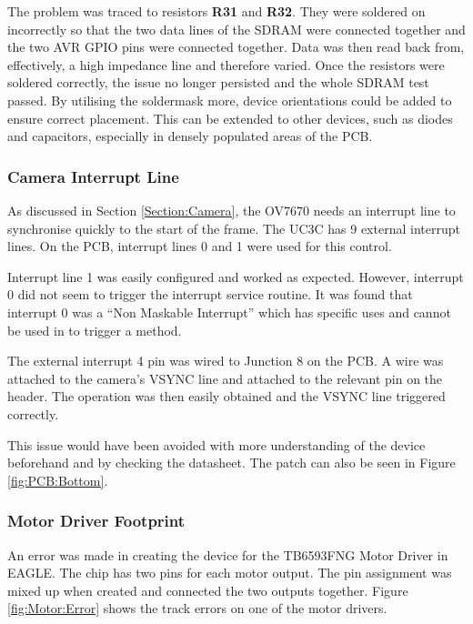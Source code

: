 The problem was traced to resistors \textbf{R31} and \textbf{R32}. They were soldered on incorrectly so that the two data lines of the SDRAM were connected together and the two AVR GPIO pins were connected together. Data was then read back from, effectively, a high impedance line and therefore varied. Once the resistors were soldered correctly, the issue no longer persisted and the whole SDRAM test passed. By utilising the soldermask more, device orientations could be added to ensure correct placement. This can be extended to other devices, such as diodes and capacitors, especially in densely populated areas of the PCB. 

\subsubsection{Camera Interrupt Line}

As discussed in Section \ref{Section:Camera}, the OV7670 needs an interrupt line to synchronise quickly to the start of the frame. The UC3C has 9 external interrupt lines. On the PCB, interrupt lines 0 and 1 were used for this control.

Interrupt line 1 was easily configured and worked as expected. However, interrupt 0 did not seem to trigger the interrupt service routine. It was found that interrupt 0 was a ``Non Maskable Interrupt'' which has specific uses and cannot be used in to trigger a method. 

The external interrupt 4 pin was wired to Junction 8 on the PCB. A wire was attached to the camera's VSYNC line and attached to the relevant pin on the header. The operation was then easily obtained and the VSYNC line triggered correctly.

This issue would have been avoided with more understanding of the device beforehand and by checking the datasheet. The patch can also be seen in Figure \ref{fig:PCB:Bottom}.


\subsubsection{Motor Driver Footprint}

An error was made in creating the device for the TB6593FNG Motor Driver in EAGLE. 
The chip has two pins for each motor output.%
The pin assignment was mixed up when created and connected the two outputs together. Figure \ref{fig:Motor:Error} shows the track errors on one of the motor drivers. 

